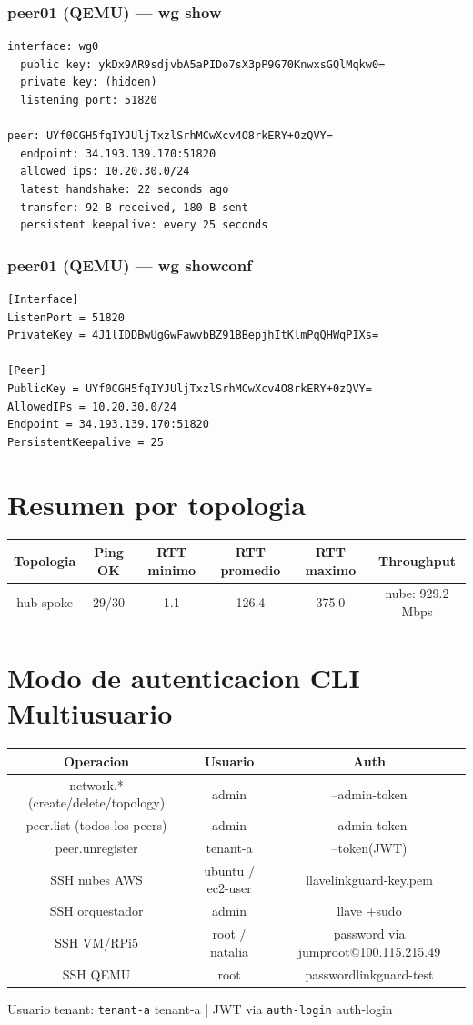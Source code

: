 \documentclass[11pt,a4paper]{article}
\begin{document}
\subsubsection*{peer01 (QEMU) — wg show}
\begin{lstlisting}
interface: wg0
  public key: ykDx9AR9sdjvbA5aPIDo7sX3pP9G70KnwxsGQlMqkw0=
  private key: (hidden)
  listening port: 51820

peer: UYf0CGH5fqIYJUljTxzlSrhMCwXcv4O8rkERY+0zQVY=
  endpoint: 34.193.139.170:51820
  allowed ips: 10.20.30.0/24
  latest handshake: 22 seconds ago
  transfer: 92 B received, 180 B sent
  persistent keepalive: every 25 seconds

\end{lstlisting}

\subsubsection*{peer01 (QEMU) — wg showconf}
\begin{lstlisting}
[Interface]
ListenPort = 51820
PrivateKey = 4J1lIDDBwUgGwFawvbBZ91BBepjhItKlmPqQHWqPIXs=

[Peer]
PublicKey = UYf0CGH5fqIYJUljTxzlSrhMCwXcv4O8rkERY+0zQVY=
AllowedIPs = 10.20.30.0/24
Endpoint = 34.193.139.170:51820
PersistentKeepalive = 25

\end{lstlisting}

\section{Resumen por topologia}
\begin{longtable}{|c|c|c|c|c|c|}
\hline
Topologia & Ping OK & RTT minimo & RTT promedio & RTT maximo & Throughput \\ \hline
hub-spoke & 29/30 & 1.1 & 126.4 & 375.0 & nube: 929.2 Mbps \\ \hline
\end{longtable}

\section{Modo de autenticacion CLI Multiusuario}
\begin{longtable}{|c|c|c|}
\hline
Operacion & Usuario & Auth \\ \hline
network.* (create/delete/topology) & admin & --admin-token \\ \hline
peer.list (todos los peers) & admin & --admin-token \\ \hline
peer.unregister & tenant-a & --token(JWT) \\ \hline
SSH nubes AWS & ubuntu / ec2-user & llavelinkguard-key.pem \\ \hline
SSH orquestador & admin & llave +sudo \\ \hline
SSH VM/RPi5 & root / natalia & password via jumproot@100.115.215.49 \\ \hline
SSH QEMU & root & passwordlinkguard-test \\ \hline
\end{longtable}

Usuario tenant:  \texttt{tenant-a} tenant-a  | JWT via  \texttt{auth-login} auth-login\\
\end{document}
